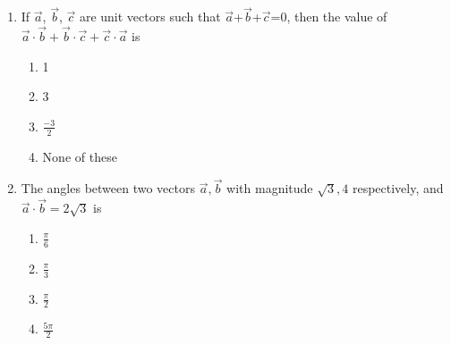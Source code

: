 \begin{enumerate}[label=\thesubsection.\arabic*,ref=\thesubsection.\theenumi]
\item If $\vec{a}$, $\vec{b}$, $\vec{c}$ are unit vectors such that $\vec{a}$+$\vec{b}$+$\vec{c}$=0, then the value of $\vec{a} \cdot \vec{b}+\vec{b} \cdot \vec{c}+\vec{c} \cdot \vec{a}$ is
	\begin{enumerate}
\item 1
\item 3
\item $\frac{-3}{2}$
\item None of these
\end{enumerate}
\item The angles between two vectors $\vec{a}, \vec{b}$ with magnitude $\sqrt{3}, 4$ respectively, and $\vec{a} \cdot \vec{b}= 2\sqrt{3}$ is
	\begin{enumerate}
\item $\frac{\pi}{6}$
\item $\frac{\pi}{3}$
\item $\frac{\pi}{2}$ 
\item $\frac{5\pi}{2}$
\end{enumerate}


\end{enumerate}
